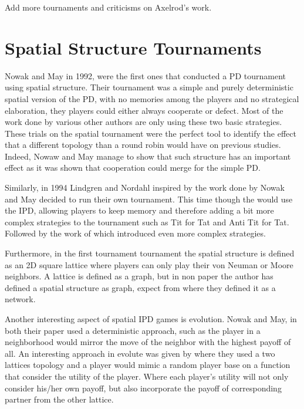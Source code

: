 Add more tournaments and criticisms on Axelrod's work.

\section{Spatial Structure Tournaments}

Nowak and May in 1992, were the first ones that conducted a PD tournament using
spatial structure\parencite{Nowak_&_May1992}. Their tournament was a simple and
purely deterministic spatial version of the PD, with no memories among the
players and no strategical elaboration, they players could  either always
cooperate or defect. Most of the work done by various other authors are only
using these two basic strategies. These trials on the spatial tournament were the
perfect tool to identify the effect that a different topology than a round robin would have
on previous studies. Indeed,  Nowaw and May manage to show that such structure
has an important effect as it was shown that cooperation could merge for the simple PD.

Similarly, in 1994 Lindgren and Nordahl\parencite{Lindgren_&_Nordahl1994} inspired by the work
done by Nowak and May decided to run their own tournament. This time though the would use the
IPD, allowing players to keep memory and therefore adding a bit more complex strategies to the
tournament such as Tit for Tat and  Anti Tit for Tat. Followed  by the work of
\parencite{Brauchli_&_Killingback_&_Doebelis1999}
 which introduced even more complex strategies.

Furthermore, in the first tournament tournament the spatial structure is defined
as an 2D square lattice where players can only play their von Neuman or Moore neighbors.
A lattice is defined as a graph, but
in non paper the author has defined a spatial structure as graph, expect from
\parencite{Meng&Xia_etc2015} where they defined it as a network.

Another interesting aspect of spatial IPD games is evolution. Nowak and May, in both
their paper used a deterministic approach, such as the player in a neighborhood
would mirror the move of the neighbor with the highest payoff of all.
An interesting approach in evolute was given by \parencite{Meng&Xia_etc2015}
where they used a two lattices topology  and a player would mimic a random player
base on a function that consider the utility of the player. Where each player’s
utility will not only consider his/her own payoff, but also incorporate the
payoff of corresponding partner from the other lattice.

